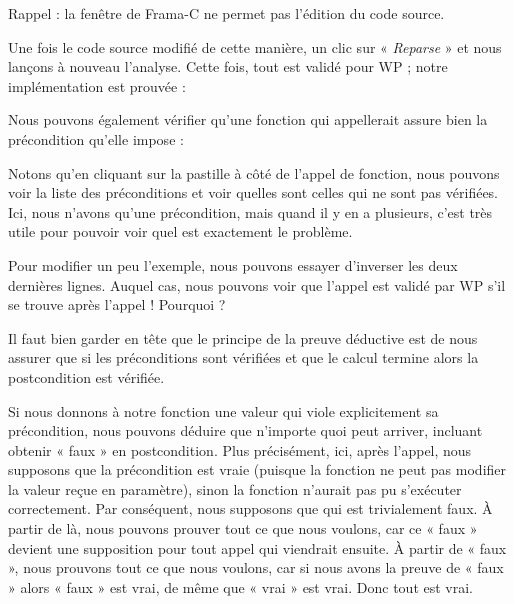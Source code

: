 \begin{Warning}
Rappel : la fenêtre de Frama-C ne permet pas l'édition du code source.
\end{Warning}


Une fois le code source modifié de cette manière, un clic sur « \textit{Reparse} » et
nous lançons à nouveau l'analyse. Cette fois, tout est validé pour WP ; notre
implémentation est prouvée :





Nous pouvons également vérifier qu'une fonction qui appellerait 
assure bien la précondition qu'elle impose :







Notons qu'en cliquant sur la pastille à côté de l'appel de fonction, nous
pouvons voir la liste des préconditions et voir quelles sont celles qui ne sont
pas vérifiées. Ici, nous n'avons qu'une précondition, mais quand il y en a
plusieurs, c'est très utile pour pouvoir voir quel est exactement le problème.




Pour modifier un peu l'exemple, nous pouvons essayer d'inverser les deux
dernières lignes. Auquel cas, nous pouvons voir que l'appel 
est validé par WP s'il se trouve après l'appel  !
Pourquoi ?



Il faut bien garder en tête que le principe de la preuve déductive est de nous
assurer que si les préconditions sont vérifiées et que le calcul termine alors
la postcondition est vérifiée.


Si nous donnons à notre fonction une valeur qui viole explicitement sa
précondition, nous pouvons déduire que n'importe quoi peut arriver, incluant
obtenir « faux » en postcondition. Plus précisément, ici, après l'appel, nous
supposons que la précondition est vraie (puisque la fonction ne peut pas
modifier la valeur reçue en paramètre), sinon la fonction n'aurait pas pu
s'exécuter correctement. Par conséquent, nous supposons que
 qui est trivialement faux. À partir de là,
nous pouvons  prouver tout ce que nous voulons, car ce « faux » devient une
supposition pour tout appel qui viendrait ensuite. À partir de « faux », nous
prouvons tout ce que
nous voulons, car si nous avons la preuve de « faux » alors « faux » est vrai,
de même que « vrai » est vrai. Donc tout est vrai.



